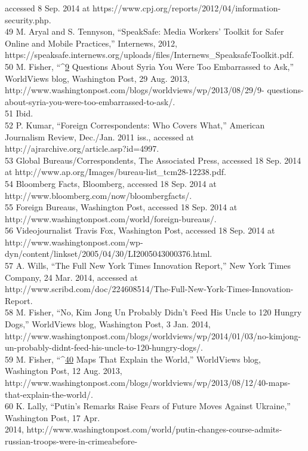 accessed 8 Sep. 2014 at https://www.cpj.org/reports/2012/04/information-security.php.\\
49 M. Aryal and S. Tennyson, ``SpeakSafe: Media Workers’ Toolkit for Safer Online and Mobile Practices,''
Internews, 2012, https://speaksafe.internews.org/uploads/files/Internews_SpeaksafeToolkit.pdf.\\
50 M. Fisher, ``^{\href{#endnotes}{9}} Questions About Syria You Were Too Embarrassed to Ask,'' WorldViews blog,
Washington Post, 29 Aug. 2013, http://www.washingtonpost.com/blogs/worldviews/wp/2013/08/29/9-
questions-about-syria-you-were-too-embarrassed-to-ask/.\\
51 Ibid.\\
52 P. Kumar, ``Foreign Correspondents: Who Covers What,'' American Journalism Review, Dec./Jan. 2011
iss., accessed at http://ajrarchive.org/article.asp?id=4997.\\
53 Global Bureaus/Correspondents, The Associated Press, accessed 18 Sep. 2014 at
http://www.ap.org/Images/bureau-list_tcm28-12238.pdf.\\
54 Bloomberg Facts, Bloomberg, accessed 18 Sep. 2014 at http://www.bloomberg.com/now/bloombergfacts/.\\
55 Foreign Bureaus, Washington Post, accessed 18 Sep. 2014 at
http://www.washingtonpost.com/world/foreign-bureaus/.\\
56 Videojournalist Travis Fox, Washington Post, accessed 18 Sep. 2014 at
http://www.washingtonpost.com/wp-dyn/content/linkset/2005/04/30/LI2005043000376.html.\\
57 A. Wills, ``The Full New York Times Innovation Report,'' New York Times Company, 24 Mar. 2014,
accessed at http://www.scribd.com/doc/224608514/The-Full-New-York-Times-Innovation-Report.\\
58 M. Fisher, ``No, Kim Jong Un Probably Didn’t Feed His Uncle to 120 Hungry Dogs,'' WorldViews blog,
Washington Post, 3 Jan. 2014, http://www.washingtonpost.com/blogs/worldviews/wp/2014/01/03/no-kimjong-
un-probably-didnt-feed-his-uncle-to-120-hungry-dogs/.\\
59 M. Fisher, ``^{\href{#endnotes}{40}} Maps That Explain the World,'' WorldViews blog, Washington Post, 12 Aug. 2013,
http://www.washingtonpost.com/blogs/worldviews/wp/2013/08/12/40-maps-that-explain-the-world/.\\
60 K. Lally, ``Putin’s Remarks Raise Fears of Future Moves Against Ukraine,'' Washington Post, 17 Apr.\\
2014, http://www.washingtonpost.com/world/putin-changes-course-admits-russian-troops-were-in-crimeabefore-
